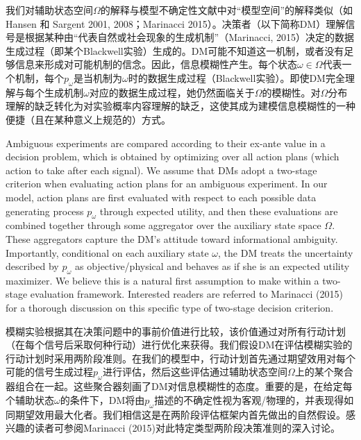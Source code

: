 \documentclass[12pt,a4paper]{article}
\newenvironment{original}
  {\par\vspace{4pt}\noindent\color{black}\ignorespaces}
  {\par\vspace{2pt}}
\newenvironment{translation}
  {\par\vspace{2pt}\noindent\color{myblue}\ignorespaces}
  {\par\vspace{6pt}}
\begin{document}
\begin{translation}
我们对辅助状态空间$\Omega$的解释与模型不确定性文献中对``模型空间''的解释类似（如 Hansen 和 Sargent 2001, 2008；Marinacci 2015）。决策者（以下简称DM）理解信号是根据某种由``代表自然或社会现象的生成机制''（Marinacci, 2015）决定的数据生成过程（即某个Blackwell实验）生成的。DM可能不知道这一机制，或者没有足够信息来形成对可能机制的信念。因此，信息模糊性产生。每个状态$\omega\in\Omega$代表一个机制，每个$p_{\omega}$是当机制为$\omega$时的数据生成过程（Blackwell实验）。即使DM完全理解与每个生成机制$\omega$对应的数据生成过程，她仍然面临关于$\Omega$的模糊性。对$\Omega$分布理解的缺乏转化为对实验概率内容理解的缺乏，这使其成为建模信息模糊性的一种便捷（且在某种意义上规范的）方式。
\end{translation}

\begin{original}
Ambiguous experiments are compared according to their ex-ante value in a decision problem, which is obtained by optimizing over all action plans (which action to take after each signal). We assume that DMs adopt a two-stage criterion when evaluating action plans for an ambiguous experiment. In our model, action plans are first evaluated with respect to each possible data generating process $p_{\omega}$ through expected utility, and then these evaluations are combined together through some aggregator over the auxiliary state space $\Omega$. These aggregators capture the DM's attitude toward informational ambiguity. Importantly, conditional on each auxiliary state $\omega$, the DM treats the uncertainty described by $p_{\omega}$ as objective/physical and behaves as if she is an expected utility maximizer. We believe this is a natural first assumption to make within a two-stage evaluation framework. Interested readers are referred to Marinacci (2015) for a thorough discussion on this specific type of two-stage decision criterion.
\end{original}

\begin{translation}
模糊实验根据其在决策问题中的事前价值进行比较，该价值通过对所有行动计划（在每个信号后采取何种行动）进行优化来获得。我们假设DM在评估模糊实验的行动计划时采用两阶段准则。在我们的模型中，行动计划首先通过期望效用对每个可能的信号生成过程$p_{\omega}$进行评估，然后这些评估通过辅助状态空间$\Omega$上的某个聚合器组合在一起。这些聚合器刻画了DM对信息模糊性的态度。重要的是，在给定每个辅助状态$\omega$的条件下，DM将由$p_{\omega}$描述的不确定性视为客观/物理的，并表现得如同期望效用最大化者。我们相信这是在两阶段评估框架内首先做出的自然假设。感兴趣的读者可参阅Marinacci (2015)对此特定类型两阶段决策准则的深入讨论。
\end{translation}
\end{document}
